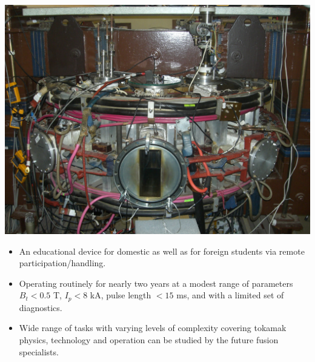 \documentclass[portrait,final,a0paper]{baposter}
\def\bi{\begin{itemize}}
\def\ei{\end{itemize}}
\def\im{\item}
\begin{document}
\begin{poster}
{
  \includegraphics[width=\textwidth]{cimg8714.jpg}
\bi
    \im An educational device for domestic as well as for foreign students via remote participation/handling.
        \im Operating routinely for nearly two years at a modest range of parameters $B_t < 0.5$ T, $I_p < 8$ kA, pulse length $< 15$ ms, and with a limited set of diagnostics. 
    \im Wide range of tasks with varying levels of complexity covering tokamak physics, technology and operation can be studied by the future fusion specialists.
\ei
 }


\end{poster}
\end{document}

